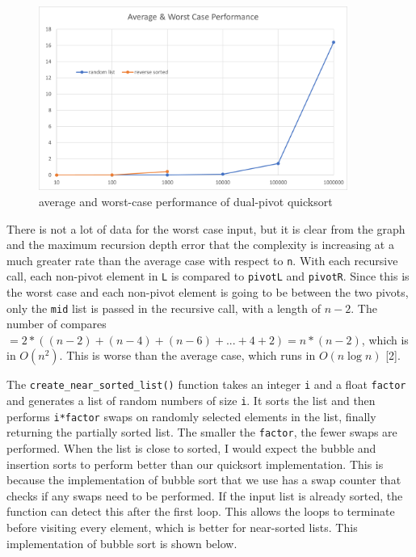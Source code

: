 \documentclass[12pt]{article}
\begin{document}
\begin{figure}[H]
\centering
\includegraphics[width=0.9\textwidth,height=\textheight,keepaspectratio]{worst_case}
\caption{average and worst-case performance of dual-pivot quicksort}
\label{Figure: w1}
\end{figure}

\noindent There is not a lot of data for the worst case input, but it is clear from the graph and the maximum recursion depth error that the complexity is increasing at a much greater rate than the average case with respect to \verb+n+. With each recursive call, each non-pivot element in \verb+L+ is compared to \verb+pivotL+ and \verb+pivotR+. Since this is the worst case and each non-pivot element is going to be between the two pivots, only the \verb+mid+ list is passed in the recursive call, with a length of $n-2$. The number of compares $= 2*((n-2) + (n-4) + (n-6) + ... + 4 + 2) = n*(n-2)$, which is in $O(n^2)$. This is worse than the average case, which runs in $O(n\log{n})$ [2].

The \verb+create_near_sorted_list()+ function takes an integer \verb+i+ and a float \verb+factor+ and generates a list of random numbers of size \verb+i+. It sorts the list and then performs \verb+i*factor+ swaps on randomly selected elements in the list, finally returning the partially sorted list. The smaller the \verb+factor+, the fewer swaps are performed. When the list is close to sorted, I would expect the bubble and insertion sorts to perform better than our quicksort implementation. This is because the implementation of bubble sort that we use has a swap counter that checks if any swaps need to be performed. If the input list is already sorted, the function can detect this after the first loop. This allows the loops to terminate before visiting every element, which is better for near-sorted lists. This implementation of bubble sort is shown below.
\end{document}
